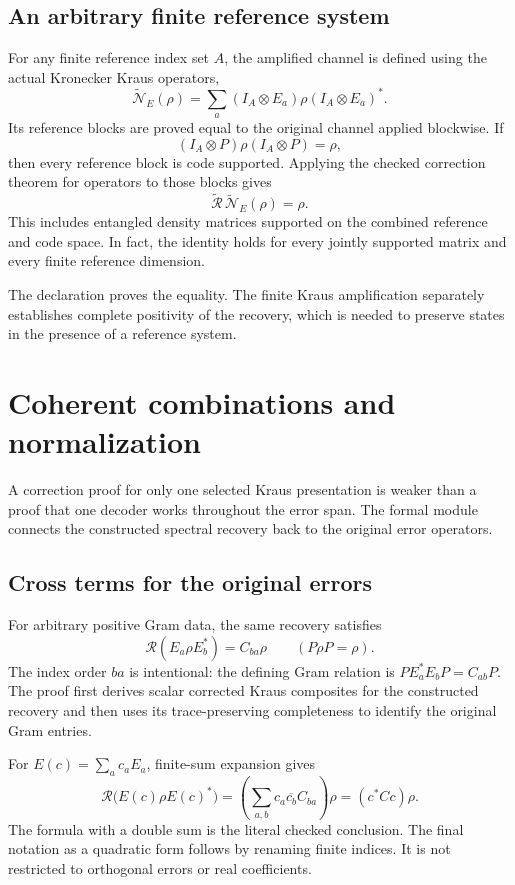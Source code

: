 \subsection{An arbitrary finite reference system}
For any finite reference index set $A$, the amplified channel is defined using the actual Kronecker Kraus operators,
\[
\widetilde{\mathcal N}_E(\rho)
=\sum_a(I_A\otimes E_a)\rho(I_A\otimes E_a)^*.
\]
Its reference blocks are proved equal to the original channel applied blockwise. If
\[
(I_A\otimes P)\rho(I_A\otimes P)=\rho,
\]
then every reference block is code supported. Applying the checked correction theorem for operators to those blocks gives
\[
\boxed{\widetilde{\mathcal R}\,\widetilde{\mathcal N}_E(\rho)=\rho.}
\]
This includes entangled density matrices supported on the combined reference and code space. In fact, the identity holds for every jointly supported matrix and every finite reference dimension.

The declaration  proves the equality. The finite Kraus amplification separately establishes complete positivity of the recovery, which is needed to preserve states in the presence of a reference system.



\section{Coherent combinations and normalization}\label{supp5:section:005}
A correction proof for only one selected Kraus presentation is weaker than a proof that one decoder works throughout the error span. The formal module connects the constructed spectral recovery back to the original error operators.

\subsection{Cross terms for the original errors}
For arbitrary positive Gram data, the same recovery satisfies
\[
\boxed{\mathcal R(E_a\rho E_b^*)=C_{ba}\rho\qquad(P\rho P=\rho).}
\]
The index order $ba$ is intentional: the defining Gram relation is $PE_a^*E_bP=C_{ab}P$. The proof first derives scalar corrected Kraus composites for the constructed recovery and then uses its trace-preserving completeness to identify the original Gram entries.

For $E(c)=\sum_a c_aE_a$, finite-sum expansion gives
\[
\mathcal R\bigl(E(c)\rho E(c)^*\bigr)
=\left(\sum_{a,b}c_a\overline{c_b}C_{ba}\right)\rho
=(c^*Cc)\rho.
\]
The formula with a double sum is the literal checked conclusion. The final notation as a quadratic form follows by renaming finite indices. It is not restricted to orthogonal errors or real coefficients.

